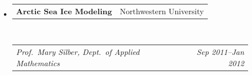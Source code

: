 \documentclass[10pt,letterpaper]{article}
\makeatletter
\newcommand{\headerrow}[2]
{\begin{tabular*}{\linewidth}{l@{\extracolsep{\fill}}r}
	#1 &
	#2 \\
\end{tabular*}}
\makeatother
\begin{document}
\begin{itemize}
	
	\item
	\headerrow
		{\textbf{Arctic Sea Ice Modeling}}
		{Northwestern University}	\\
	\headerrow
		{\emph{Prof.~Mary Silber, Dept.~of Applied Mathematics}}
		{\emph{Sep 2011--Jan 2012}}

	

\end{itemize}
\end{document}
